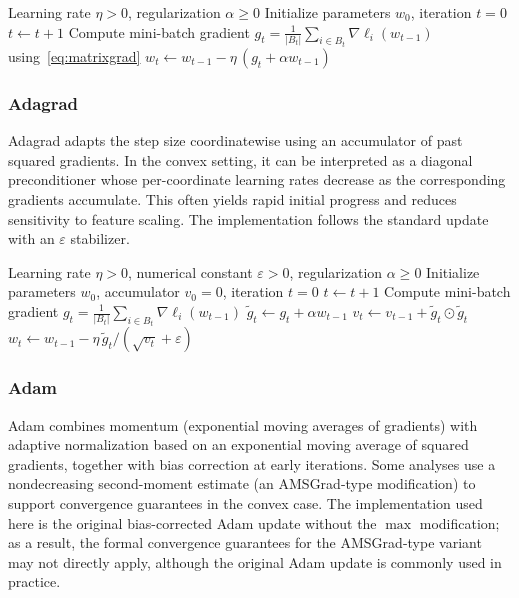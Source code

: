 \documentclass[11pt]{article}
\numberwithin{equation}{section}
\numberwithin{table}{section}
\numberwithin{figure}{section}
\numberwithin{algorithm}{section}
\begin{document}
\begin{algorithm}[H]
\caption{SGD update.}
\label{alg:sgd}
\begin{algorithmic}[1]
\Require Learning rate \(\eta>0\), regularization \(\alpha\ge 0\)
\State Initialize parameters \(w_0\), iteration \(t=0\)
\State \(t\gets t+1\)
\State Compute mini-batch gradient \(g_t=\frac{1}{|B_t|}\sum_{i\in B_t}\nabla \ell_i(w_{t-1})\) using~\eqref{eq:matrixgrad}
\State \(w_t \gets w_{t-1} - \eta\,(g_t+\alpha w_{t-1})\)
\EndFor
\end{algorithmic}
\end{algorithm}

\subsubsection{Adagrad}
Adagrad adapts the step size coordinatewise using an accumulator of past squared gradients. In the convex setting, it can be interpreted as a diagonal preconditioner whose per-coordinate learning rates decrease as the corresponding gradients accumulate. This often yields rapid initial progress and reduces sensitivity to feature scaling. The implementation follows the standard update with an \(\varepsilon\) stabilizer.

\begin{algorithm}[H]
\caption{Adagrad update.}
\label{alg:adagrad}
\begin{algorithmic}[1]
\Require Learning rate \(\eta>0\), numerical constant \(\varepsilon>0\), regularization \(\alpha\ge 0\)
\State Initialize parameters \(w_0\), accumulator \(v_0=0\), iteration \(t=0\)
\State \(t\gets t+1\)
\State Compute mini-batch gradient \(g_t=\frac{1}{|B_t|}\sum_{i\in B_t}\nabla \ell_i(w_{t-1})\)
\State \(\tilde{g}_t \gets g_t+\alpha w_{t-1}\)
\State \(v_t \gets v_{t-1} + \tilde{g}_t\odot \tilde{g}_t\)
\State \(w_t \gets w_{t-1} - \eta\, \tilde{g}_t/(\sqrt{v_t}+\varepsilon)\)
\EndFor
\end{algorithmic}
\end{algorithm}

\subsubsection{Adam}
Adam combines momentum (exponential moving averages of gradients) with adaptive normalization based on an exponential moving average of squared gradients, together with bias correction at early iterations. Some analyses use a nondecreasing second-moment estimate (an AMSGrad-type modification) to support convergence guarantees in the convex case. The implementation used here is the original bias-corrected Adam update without the \(\max\) modification; as a result, the formal convergence guarantees for the AMSGrad-type variant may not directly apply, although the original Adam update is commonly used in practice.
\end{document}

